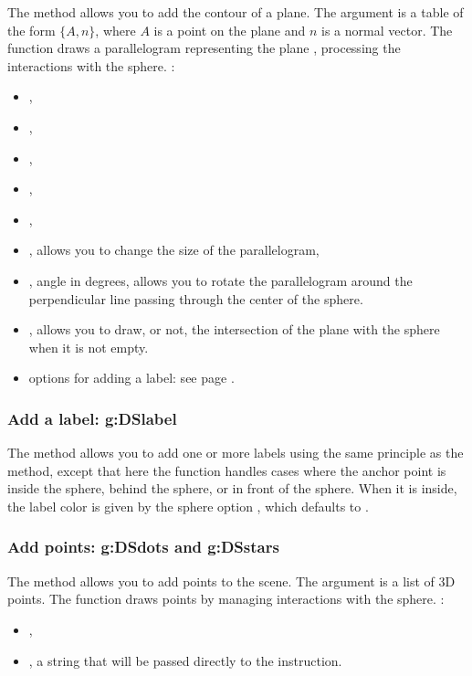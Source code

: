 The  method allows you to add the contour of a plane. The argument  is a table of the form $\{A,n\}$, where $A$ is a point on the plane and $n$ is a normal vector. The function draws a parallelogram representing the plane , processing the interactions with the sphere. \writeoptions:
\begin{itemize}
    \item {},
    \item {},
    \item {},
    \item {},
    \item {},
    \item {}, allows you to change the size of the parallelogram,
    \item {}, angle in degrees, allows you to rotate the parallelogram around the perpendicular line passing through the center of the sphere.
    \item {}, allows you to draw, or not, the intersection of the plane with the sphere when it is not empty.
    \item options for adding a label: see page \pageref{addlabel}.
\end{itemize}

\subsubsection{Add a label: g:DSlabel}

The  method allows you to add one or more labels using the same principle as the  method, except that here the function handles cases where the anchor point is inside the sphere, behind the sphere, or in front of the sphere. When it is inside, the label color is given by the sphere option , which defaults to .

\subsubsection{Add points: g:DSdots and g:DSstars}

The  method allows you to add points to the scene. The  argument is a list of 3D points. The function draws points by managing interactions with the sphere. \writeoptions:
\begin{itemize}
    \item {},
    \item {}, a string that will be passed directly to the \drawcmd instruction.
\end{itemize}

